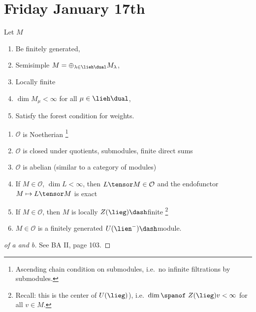 \hypertarget{friday-january-17th}{%
\section{Friday January 17th}\label{friday-january-17th}}

Let \(M\)

\begin{enumerate}
\def\labelenumi{\arabic{enumi}.}
\tightlist
\item
  Be finitely generated,
\item
  Semisimple \(M = \oplus_{\lambda \in \lieh\dual} M_\lambda\),
\item
  Locally finite
\item
  \(\dim M_\mu < \infty\) for all \(\mu \in \lieh\dual\),
\item
  Satisfy the forest condition for weights.
\end{enumerate}

\begin{theorem}[Properties of $\OO$]

\envlist

\begin{enumerate}
\def\labelenumi{\alph{enumi}.}
\item
  \(\mathcal O\) is Noetherian \footnote{Ascending chain condition on
    submodules, i.e.~no infinite filtrations by submodules.}
\item
  \(\mathcal O\) is closed under quotients, submodules, finite direct
  sums
\item
  \(\mathcal O\) is abelian (similar to a category of modules)
\item
  If \(M\in \mathcal O\), \(\dim L < \infty\), then
  \(L \tensor M \in \mathcal O\) and the endofunctor
  \(M \mapsto L\tensor M\) is exact
\item
  If \(M\in \mathcal O\), then \(M\) is locally \(Z(\lieg)\dash\)finite
  \footnote{Recall: this is the center of \(U(\lieg)\)),
    i.e.~\(\dim\spanof ~Z(\lieg)v < \infty\) for all \(v\in M\).}
\item
  \(M\in \mathcal O\) is a finitely generated \(U(\lien^-)\dash\)module.
\end{enumerate}

\end{theorem}

\begin{proof}[of a and b]

See BA II, page 103.

\end{proof}

